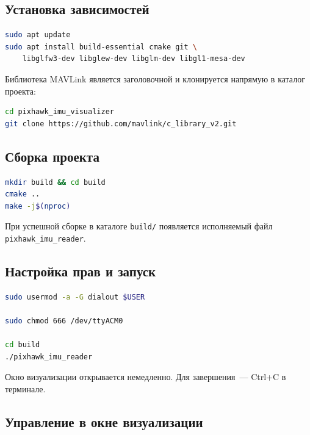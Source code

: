 \documentclass[../main.tex]{subfiles}
\begin{document}
\subsection{Установка зависимостей}
 
\begin{lstlisting}[language=bash,caption={Установка системных зависимостей}]
sudo apt update
sudo apt install build-essential cmake git \
    libglfw3-dev libglew-dev libglm-dev libgl1-mesa-dev
\end{lstlisting}
 
Библиотека MAVLink является заголовочной и клонируется напрямую в каталог
проекта:
 
\begin{lstlisting}[language=bash,caption={Клонирование MAVLink}]
cd pixhawk_imu_visualizer
git clone https://github.com/mavlink/c_library_v2.git
\end{lstlisting}
 
\subsection{Сборка проекта}
 
\begin{lstlisting}[language=bash,caption={Сборка через CMake}]
mkdir build && cd build
cmake ..
make -j$(nproc)
\end{lstlisting}
 
При успешной сборке в каталоге \texttt{build/} появляется исполняемый файл
\texttt{pixhawk\_imu\_reader}.
 
\subsection{Настройка прав и запуск}
 
\begin{lstlisting}[language=bash,caption={Права на порт и запуск}]
sudo usermod -a -G dialout $USER

sudo chmod 666 /dev/ttyACM0
 
cd build
./pixhawk_imu_reader
\end{lstlisting}
 
Окно визуализации открывается немедленно. Для завершения~--- Ctrl+C в
терминале.
 
\subsection{Управление в окне визуализации}
 
\end{document}
